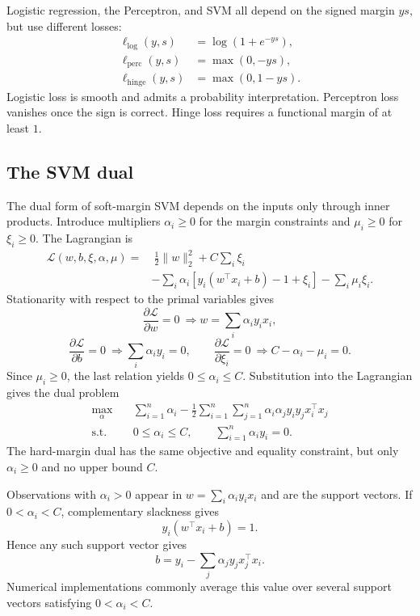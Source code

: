 Logistic regression, the Perceptron, and SVM all depend on the signed margin
$ys$, but use different losses:
\[
\begin{aligned}
\ell_{\mathrm{log}}(y,s)&=\log(1+e^{-ys}),\\
\ell_{\mathrm{perc}}(y,s)&=\max(0,-ys),\\
\ell_{\mathrm{hinge}}(y,s)&=\max(0,1-ys).
\end{aligned}
\]
Logistic loss is smooth and admits a probability interpretation. Perceptron
loss vanishes once the sign is correct. Hinge loss requires a functional margin
of at least $1$.

\subsection{The SVM dual}

The dual form of soft-margin SVM depends on the inputs only through inner
products. Introduce multipliers $\alpha_i\ge0$ for the margin constraints and
$\mu_i\ge0$ for $\xi_i\ge0$. The Lagrangian is
\begin{align*}
\mathcal L(w,b,\xi,\alpha,\mu)
=&\ \frac12\lVert w\rVert_2^2+C\sum_i\xi_i\\
&-\sum_i\alpha_i
\left[y_i(w^\top x_i+b)-1+\xi_i\right]
-\sum_i\mu_i\xi_i.
\end{align*}
Stationarity with respect to the primal variables gives
\[
\frac{\partial\mathcal L}{\partial w}=0
\ \Longrightarrow
w=\sum_i\alpha_i y_ix_i,
\]
\[
\frac{\partial\mathcal L}{\partial b}=0
\ \Longrightarrow
\sum_i\alpha_i y_i=0,
\qquad
\frac{\partial\mathcal L}{\partial\xi_i}=0
\ \Longrightarrow
C-\alpha_i-\mu_i=0.
\]
Since $\mu_i\ge0$, the last relation yields $0\le\alpha_i\le C$. Substitution
into the Lagrangian gives the dual problem
\begin{align*}
\max_{\alpha}\quad
&\sum_{i=1}^{n}\alpha_i
-\frac12\sum_{i=1}^{n}\sum_{j=1}^{n}
\alpha_i\alpha_jy_iy_jx_i^\top x_j\\
\text{s.t.}\quad
&0\le\alpha_i\le C,
\qquad
\sum_{i=1}^{n}\alpha_i y_i=0.
\end{align*}
The hard-margin dual has the same objective and equality constraint, but only
$\alpha_i\ge0$ and no upper bound $C$.

Observations with $\alpha_i>0$ appear in
$w=\sum_i\alpha_i y_ix_i$ and are the support vectors. If
$0<\alpha_i<C$, complementary slackness gives
\[
y_i(w^\top x_i+b)=1.
\]
Hence any such support vector gives
\[
b=y_i-\sum_j\alpha_jy_jx_j^\top x_i.
\]
Numerical implementations commonly average this value over several support
vectors satisfying $0<\alpha_i<C$.


